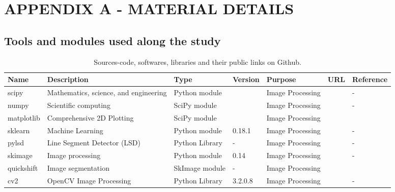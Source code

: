 \chapter{APPENDIX A - MATERIAL DETAILS}\label{apendiceA}	
    \section{Tools and modules used along the study}\label{apendiceA-tools}
    \begin{table}[!htb]
      \renewcommand{\arraystretch}{1.6}
      \caption{Sources-code, softwares, libraries and their public links on Github.}
      \scriptsize \centering	
      \begin{tabular}{L{1.8cm}|L{3.2cm}|C{1.8cm}|C{0.9cm}|C{1.4cm}|C{0.8cm}|L{2.5cm}}
	      \toprule
	      \textbf{Name} & \textbf{Description}  & \textbf{Type} & \textbf{Version} & \textbf{Purpose} & \textbf{URL} & \textbf{Reference} \\ 
	      \toprule
	      scipy & Mathematics, science, and engineering & Python module & & Image Processing & \href{https://www.scipy.org}{\faLink} & - \\ 
	      numpy & Scientific computing & SciPy module & & Image Processing & \href{http://www.numpy.org}{\faLink} & - \\
	      matplotlib & Comprehensive 2D Plotting & SciPy module & & Image Processing & \href{http://matlibplot.sourceforce.net}{\faLink} & \cite{hunter2007} \\ 
	      sklearn & Machine Learning & Python module & 0.18.1 & Image Processing & \href{http://scikit-learn.org}{\faLink} & - \\ 
	      pylsd & Line Segment Detector (LSD) & Python Library & - & Image Processing & \href{https://github.com/primetang/pylsd}{\faGithub}$~~$\href{http://www.ipol.im/pub/art/2012/gjmr-lsd/}{\faLink} & - \\ 
	      skimage & Image processing & Python module & 0.14 & Image Processing & \href{http://scikit-image.org}{\faLink} & - \\ 
	      quickshift & Image segmentation & SkImage module & - & Image Processing & \href{http://scikit-image.org/docs/dev/api/skimage.segmentation.html}{\faLink} & \cite{vedaldi2008} \\ 
	      cv2 & OpenCV Image Processing & Python Library & 3.2.0.8 & Image Processing & \href{https://github.com/opencv/opencv}{\faGithub}$~~$\href{http://opencv.org}{\faLink} & - \\ \hline

\end{tabular}
\end{table}
